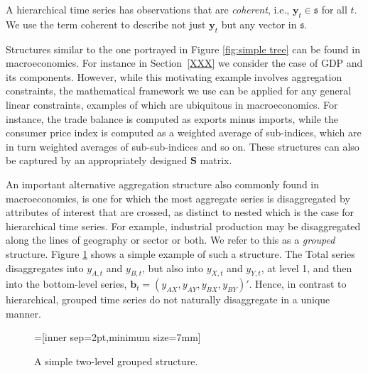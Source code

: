 \documentclass[graybox]{svmult}
\begin{document}
\begin{property}
A hierarchical time series has observations that are \textit{coherent}, i.e., $\bm{y}_{t} \in \mathfrak{s}$ for all $t$. We use the term coherent to describe not just $\bm{y}_t$ but any vector in $\mathfrak{s}$.
  \label{def:coherence}
\end{property}


Structures similar to the one portrayed in Figure \ref{fig:simple tree} can be found in macroeconomics. For instance in Section~\ref{XXX} we consider the case of GDP and its components.  However, while this motivating example involves aggregation constraints, the mathematical framework we use can be applied for any general linear constraints, examples of which are ubiquitous in macroeconomics. For instance, the trade balance is computed as exports minus imports, while the consumer price index is computed as a weighted average of sub-indices, which are in turn weighted averages of sub-sub-indices and so on.  These structures can also be captured by an appropriately designed $\bm{S}$ matrix.

An important alternative aggregation structure also commonly found in macroeconomics, is one for which the most aggregate series is disaggregated by attributes of interest that are crossed, as distinct to nested which is the case for hierarchical time series. For example, industrial production may be disaggregated along the lines of geography or sector or both. We refer to this as a \textit{grouped} structure. Figure \ref{fig:simple grouped tree} shows a simple example of such a structure. The Total series disaggregates into $y_{A,t}$ and $y_{B,t}$, but also into $y_{X,t}$ and $y_{Y,t}$, at level 1, and then into the bottom-level series, $\bm{b}_t=(y_{AX}, y_{AY}, y_{BX}, y_{BY})'$. Hence, in contrast to hierarchical, grouped time series do not naturally disaggregate in a unique manner.
\begin{figure}[!hbt]
\center
{}=[inner sep=2pt,minimum size=7mm]
  \caption{A simple two-level grouped structure.}
  \label{fig:simple grouped tree}
\end{figure}
\end{document}
